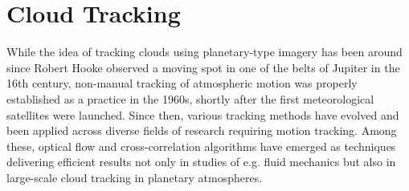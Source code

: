 \section{Cloud Tracking}

While the idea of tracking clouds using planetary-type imagery has been around since Robert Hooke observed a moving spot in one of the belts of Jupiter in the 16th century\cite{Hooke1665}, non-manual tracking of atmospheric motion was properly established as a practice in the 1960s, shortly after the first meteorological satellites were launched\cite{Menzel2001}. Since then, various tracking methods have evolved and been applied across diverse fields of research requiring motion tracking. Among these, optical flow and cross-correlation algorithms have emerged as techniques delivering efficient results not only in studies of e.g. fluid mechanics but also in large-scale cloud tracking in planetary atmospheres. 



